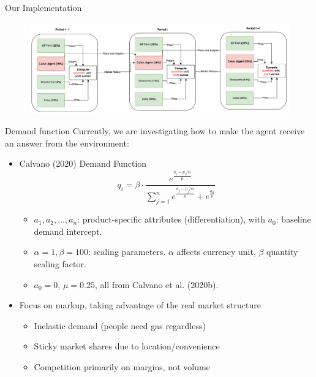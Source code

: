\documentclass[10pt]{beamer}
\begin{document}
\subsection{}

\begin{frame}[fragile]{Our Implementation}
\begin{figure}
    \centering
    \includegraphics[width=1.5\linewidth]{slides_pricing_collusion/imgs/diagram.png}
    \caption{}
    \label{fig:enter-label}
\end{figure}
  
\end{frame}

\begin{frame}[fragile]{Demand function}
Currently, we are investigating how to make the agent receive an answer from the environment:
\begin{itemize}
    \item Calvano (2020) Demand Function
    $$
q_i = \beta \cdot \frac{e^{\frac{a_i - p_i/\alpha}{\mu}}}{\sum_{j=1}^{n} e^{\frac{a_j - p_j/\alpha}{\mu}} + e^{\frac{a_0}{\mu}}}
$$
\begin{itemize}
    \item $a_1, a_2, \ldots, a_n$: product-specific attributes (differentiation), with $a_0$: baseline demand intercept.
    \item $\alpha=1, \beta=100$: scaling parameters. $\alpha$ affects currency unit, $\beta$ quantity scaling factor.
    \item $a_0 = 0$, $\mu = 0.25$, all from Calvano et al. (2020b).
\end{itemize}
    \item Focus on markup, taking advantage of the real market structure
    \begin{itemize}
        \item Inelastic demand (people need gas regardless)
        \item Sticky market shares due to location/convenience
        \item Competition primarily on margins, not volume
    \end{itemize}
\end{itemize}
  
\end{frame}
\end{document}
